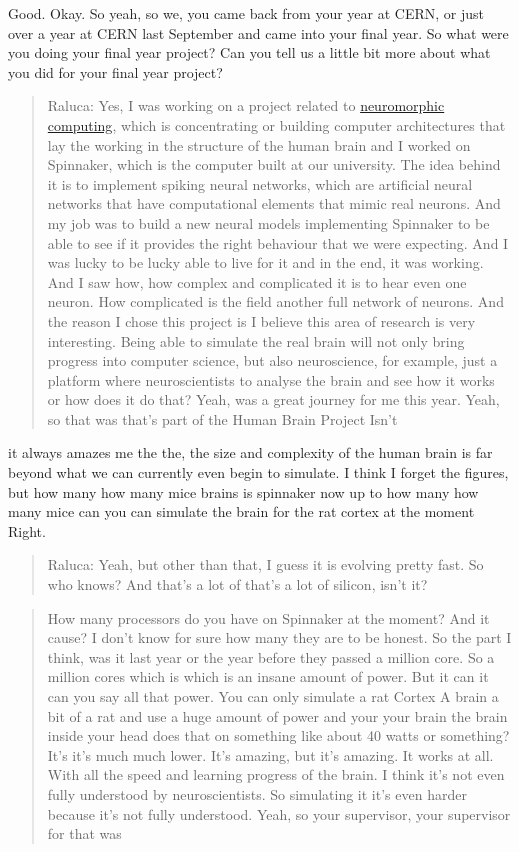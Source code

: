 \documentclass[
]{book}
\begin{document}
Good. Okay. So yeah, so we, you came back from your year at CERN, or just over a year at CERN last September and came into your final year. So what were you doing your final year project? Can you tell us a little bit more about what you did for your final year project?

\begin{quote}
Raluca: Yes, I was working on a project related to \href{https://en.wikipedia.org/wiki/Neuromorphic_engineering}{neuromorphic computing}, which is concentrating or building computer architectures that lay the working in the structure of the human brain and I worked on Spinnaker, which is the computer built at our university. The idea behind it is to implement spiking neural networks, which are artificial neural networks that have computational elements that mimic real neurons. And my job was to build a new neural models implementing Spinnaker to be able to see if it provides the right behaviour that we were expecting. And I was lucky to be lucky able to live for it and in the end, it was working. And I saw how, how complex and complicated it is to hear even one neuron. How complicated is the field another full network of neurons. And the reason I chose this project is I believe this area of research is very interesting. Being able to simulate the real brain will not only bring progress into computer science, but also neuroscience, for example, just a platform where neuroscientists to analyse the brain and see how it works or how does it do that? Yeah, was a great journey for me this year. Yeah, so that was that's part of the Human Brain Project Isn't
\end{quote}

it always amazes me the the, the size and complexity of the human brain is far beyond what we can currently even begin to simulate. I think I forget the figures, but how many how many mice brains is spinnaker now up to how many how many mice can you can simulate the brain for the rat cortex at the moment Right.

\begin{quote}
Raluca: Yeah, but other than that, I guess it is evolving pretty fast. So who knows? And that's a lot of that's a lot of silicon, isn't it?
\end{quote}

\begin{quote}
How many processors do you have on Spinnaker at the moment? And it cause? I don't know for sure how many they are to be honest. So the part I think, was it last year or the year before they passed a million core. So a million cores which is which is an insane amount of power. But it can it can you say all that power. You can only simulate a rat Cortex A brain a bit of a rat and use a huge amount of power and your your brain the brain inside your head does that on something like about 40 watts or something? It's it's much much lower. It's amazing, but it's amazing. It works at all. With all the speed and learning progress of the brain. I think it's not even fully understood by neuroscientists. So simulating it it's even harder because it's not fully understood. Yeah, so your supervisor, your supervisor for that was
\end{quote}
\end{document}
